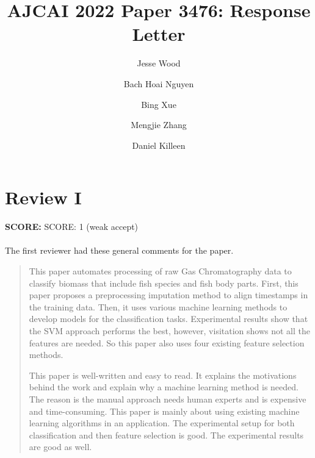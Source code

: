 \documentclass[runningheads]{llncs}
\begin{document}
\title{AJCAI 2022 Paper 3476: Response Letter}

\author{Jesse Wood \and
  Bach Hoai Nguyen \and
  Bing Xue \and 
  Mengjie Zhang \and 
  Daniel Killeen
}



\maketitle

\section{Review I}

\textbf{SCORE:} SCORE: 1 (weak accept)
\\\\
The first reviewer had these general comments for the paper. 

\begin{quote}
  This paper automates processing of raw Gas Chromatography data to classify biomass that include fish species and fish body parts. First, this paper proposes a preprocessing imputation method to align timestamps in the training data. Then, it uses various machine learning methods to develop models for the classification tasks. Experimental results show that the SVM approach performs the best, however, visitation shows not all the features are needed. So this paper also uses four existing feature selection methods.

  This paper is well-written and easy to read. It explains the motivations behind the work and explain why a machine learning method is needed. The reason is the manual approach needs human experts and is expensive and time-consuming. This paper is mainly about using existing machine learning algorithms in an application. The experimental setup for both classification and then feature selection is good. The experimental results are good as well.
\end{quote}
\end{document}
